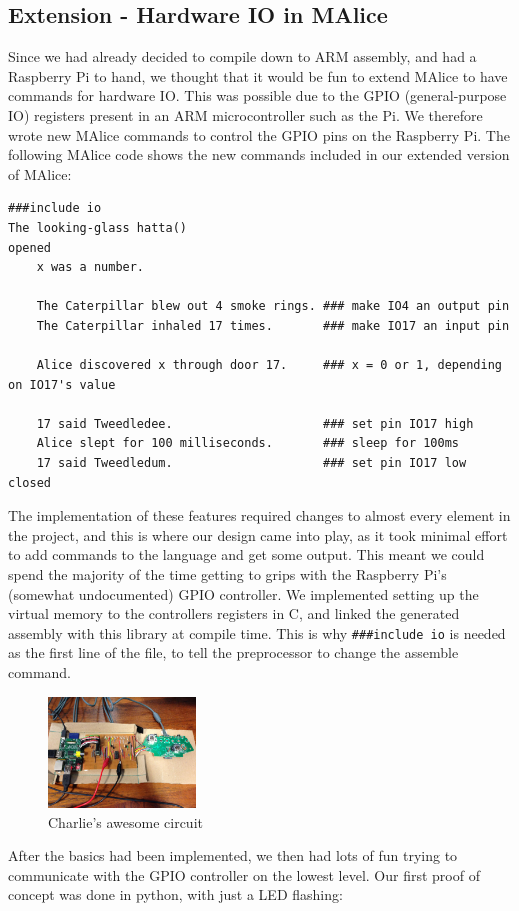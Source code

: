 \documentclass[11pt, notitlepage]{report}
\begin{document}
\subsection*{Extension - Hardware IO in MAlice}
Since we had already decided to compile down to ARM assembly, and had a Raspberry Pi to hand, we thought that it would be fun to extend MAlice to have commands for hardware IO. This was possible due to the GPIO (general-purpose IO) registers present in an ARM microcontroller such as the Pi. We therefore wrote new MAlice commands to control the GPIO pins on the Raspberry Pi. The following MAlice code shows the new commands included in our extended version of MAlice:

\begin{verbatim}
###include io
The looking-glass hatta()
opened
    x was a number.

    The Caterpillar blew out 4 smoke rings. ### make IO4 an output pin
    The Caterpillar inhaled 17 times.       ### make IO17 an input pin

    Alice discovered x through door 17.     ### x = 0 or 1, depending on IO17's value

    17 said Tweedledee.                     ### set pin IO17 high
    Alice slept for 100 milliseconds.       ### sleep for 100ms
    17 said Tweedledum.                     ### set pin IO17 low
closed
\end{verbatim}

The implementation of these features required changes to almost every element in the project, and this is where our design came into play, as it took minimal effort to add commands to the language and get some output. This meant we could spend the majority of the time getting to grips with the Raspberry Pi's (somewhat undocumented) GPIO controller. We implemented setting up the virtual memory to the controllers registers in C, and linked the generated assembly with this library at compile time. This is why \texttt{\#\#\#include io} is needed as the first line of the file, to tell the preprocessor to change the assemble command.

\begin{figure}
  \vspace{-20pt}
  \begin{center}
    \includegraphics[width=0.35\textwidth]{IMG_9457.JPG}
    \caption{Charlie's awesome circuit}
  \end{center}
  \vspace{-10pt}
\end{figure}
After the basics had been implemented, we then had lots of fun trying to communicate with the GPIO controller on the lowest level. Our first proof of concept was done in python, with just a LED flashing:
\end{document}
